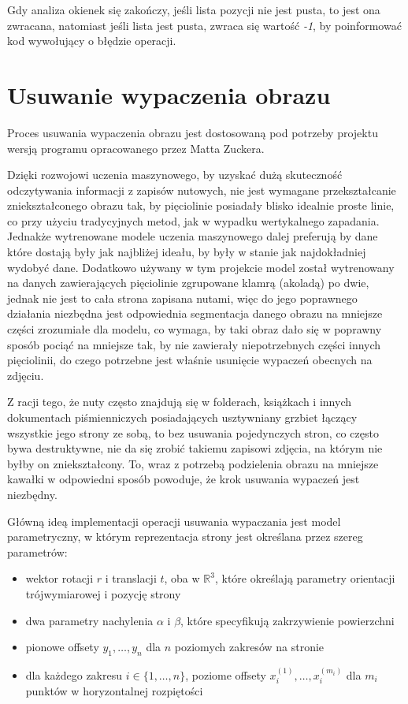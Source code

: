 Gdy analiza okienek się zakończy, jeśli lista pozycji nie jest pusta, to jest ona zwracana, natomiast jeśli lista jest pusta, zwraca się wartość \textit{-1}, by poinformować kod wywołujący o błędzie operacji.

\section{Usuwanie wypaczenia obrazu}

Proces usuwania wypaczenia obrazu jest dostosowaną pod potrzeby projektu wersją programu opracowanego przez Matta Zuckera\cite{Zucker2016}.

Dzięki rozwojowi uczenia maszynowego, by uzyskać dużą skuteczność odczytywania informacji z zapisów nutowych, nie jest wymagane przekształcanie zniekształconego obrazu tak, by pięciolinie posiadały blisko idealnie proste linie, co przy użyciu tradycyjnych metod, jak w wypadku wertykalnego zapadania. Jednakże wytrenowane modele uczenia maszynowego dalej preferują by dane które dostają były jak najbliżej ideału, by były w stanie jak najdokładniej wydobyć dane. Dodatkowo używany w tym projekcie model został wytrenowany na danych zawierających pięciolinie zgrupowane klamrą (akoladą) po dwie, jednak nie jest to cała strona zapisana nutami, więc do jego poprawnego działania niezbędna jest odpowiednia segmentacja danego obrazu na mniejsze części zrozumiałe dla modelu, co wymaga, by taki obraz dało się w poprawny sposób pociąć na mniejsze tak, by nie zawierały niepotrzebnych części innych pięciolinii, do czego potrzebne jest właśnie usunięcie wypaczeń obecnych na zdjęciu.

Z racji tego, że nuty często znajdują się w folderach, książkach i innych dokumentach piśmienniczych posiadających usztywniany grzbiet łączący wszystkie jego strony ze sobą, to bez usuwania pojedynczych stron, co często bywa destruktywne, nie da się zrobić takiemu zapisowi zdjęcia, na którym nie byłby on zniekształcony. To, wraz z potrzebą podzielenia obrazu na mniejsze kawałki w odpowiedni sposób powoduje, że krok usuwania wypaczeń jest niezbędny.

Główną ideą implementacji operacji usuwania wypaczania jest model parametryczny, w którym reprezentacja strony jest określana przez szereg parametrów:

\begin{itemize}
	\item wektor rotacji $r$ i translacji $t$, oba w $\mathbb{R}^{3}$, które określają parametry orientacji trójwymiarowej i pozycję strony
	\item dwa parametry nachylenia $\alpha$ i $\beta$, które specyfikują zakrzywienie powierzchni
	\item pionowe offsety $y_{1},\ldots,y_{n}$ dla $n$ poziomych zakresów na stronie
	\item dla każdego zakresu $i \in \{1,\ldots,n\}$, poziome offsety $x_{i}^{(1)},\ldots,x_{i}^{(m_{i})}$ dla $m_{i}$ punktów w horyzontalnej rozpiętości
\end{itemize} 

